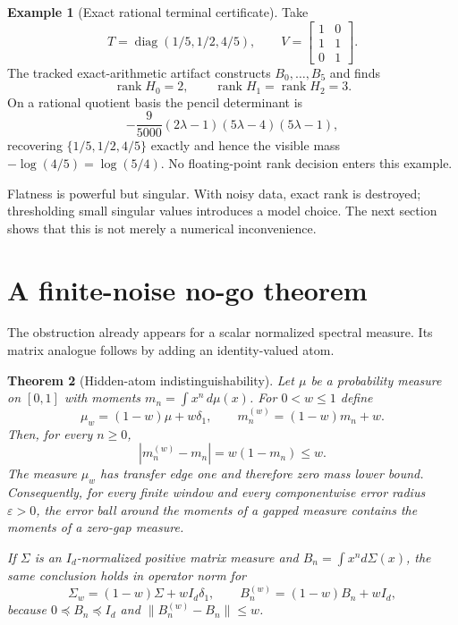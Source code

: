 \documentclass[11pt]{article}
\newtheorem{theorem}{Theorem}[section]
\theoremstyle{definition}
\newtheorem{example}[theorem]{Example}
\theoremstyle{remark}
\newcommand{\rank}{\operatorname{rank}}
\newcommand{\eps}{\varepsilon}
\begin{document}
\begin{example}[Exact rational terminal certificate]    \label{ex:rational}
Take
\[
 T=\operatorname{diag}(1/5,1/2,4/5),\qquad
 V=\begin{bmatrix}1&0\\1&1\\0&1\end{bmatrix}.
\]
The tracked exact-arithmetic artifact constructs $B_0,\ldots,B_5$ and finds
\[
 \rank H_0=2,\qquad \rank H_1=\rank H_2=3.
\]
On a rational quotient basis the pencil determinant is
\begin{equation}
 -\frac9{5000}(2\lambda-1)(5\lambda-4)(5\lambda-1),
\end{equation}
recovering $\{1/5,1/2,4/5\}$ exactly and hence the visible mass
$-\log(4/5)=\log(5/4)$.  No floating-point rank decision enters this example.
\end{example}

Flatness is powerful but singular.  With noisy data, exact rank is destroyed;
thresholding small singular values introduces a model choice.  The next
section shows that this is not merely a numerical inconvenience.

\section{A finite-noise no-go theorem}

The obstruction already appears for a scalar normalized spectral measure.
Its matrix analogue follows by adding an identity-valued atom.

\begin{theorem}[Hidden-atom indistinguishability]        \label{thm:nogo}
Let $\mu$ be a probability measure on $[0,1]$ with moments
$m_n=\int x^n\,d\mu(x)$.  For $0<w\leq1$ define
\begin{equation}
 \mu_w=(1-w)\mu+w\delta_1,
 \qquad m_n^{(w)}=(1-w)m_n+w.                          \label{eq:hiddenatom}
\end{equation}
Then, for every $n\geq0$,
\begin{equation}
  |m_n^{(w)}-m_n|=w(1-m_n)\leq w.                      \label{eq:hiddenbound}
\end{equation}
The measure $\mu_w$ has transfer edge one and therefore zero mass lower bound.
Consequently, for every finite window and every componentwise error radius
$\eps>0$, the error ball around the moments of a gapped measure contains the
moments of a zero-gap measure.

If $\Sigma$ is an $I_d$-normalized positive matrix measure and
$B_n=\int x^n d\Sigma(x)$, the same conclusion holds in operator norm for
\begin{equation}
 \Sigma_w=(1-w)\Sigma+w I_d\delta_1,
 \qquad B_n^{(w)}=(1-w)B_n+wI_d,
\end{equation}
because $0\preceq B_n\preceq I_d$ and
$\|B_n^{(w)}-B_n\|\leq w$.
\end{theorem}
\end{document}
